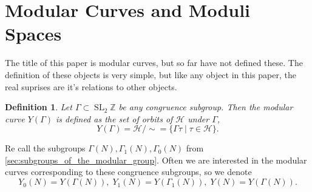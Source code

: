 \documentclass[a4paper]{article}
\theoremstyle{theoremdd}
\theoremstyle{definitiondd}
\newtheorem{definition}[theorem]{Definition}
\theoremstyle{remarkdd}
\newcommand{\Z}{\mathbb{Z}}
\DeclareMathOperator{\SL}{SL}
\begin{document}
\section{Modular Curves and Moduli Spaces} \label{sec:modular_curves_and_moduli_spaces}
The title of this paper is modular curves, but so far have not defined these. 
The definition of these objects is very simple, but like any object in this paper, the real suprises are it's relations to other objects. 
\begin{definition}
	Let $\Gamma \subset \SL_2\Z$ be any congruence subgroup. Then the \emph{modular curve} $Y(\Gamma)$ is defined as the set of orbits of $\mathcal{H} $ under  $\Gamma$, \[
		Y(\Gamma) = \mathcal{H} / \sim = \{\Gamma \tau \;|\; \tau \in \mathcal{H} \} 
	.\] 
\end{definition}
Re call the subgroups $\Gamma(N), \Gamma_1(N), \Gamma_0(N)$ from \cref{sec:subgroups_of_the_modular_group}. 
Often we are interested in the modular curves corresponding to these congruence subgroups, so we denote \[
	Y_0(N) = Y(\Gamma(N)),\; Y_1(N) = Y(\Gamma_1(N)),\; Y(N) = Y(\Gamma(N))
.\]  
\end{document}
